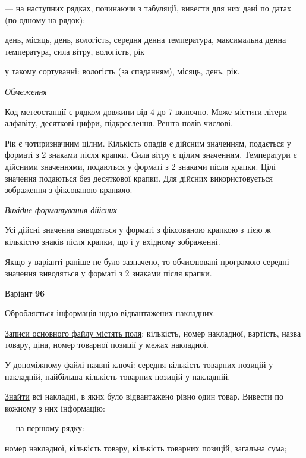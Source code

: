 \documentclass[11pt, ukrainian]{article}
\begin{document}
{\noindent}--- на наступних рядках, починаючи з табуляції, вивести для них дані по датах (по одному на рядок):\par
день, місяць, день, вологість, середня денна температура, максимальна денна температура, сила вітру, вологість, рік

{\noindent}у такому сортуванні: вологість (за спаданням), місяць, день, рік.


\bigskip\textit{Обмеження}

Код метеостанції є рядком довжини від 4 до 7 включно.
Може містити літери алфавіту, десяткові цифри, підкреслення. Решта полів числові.

Рік є чотиризначним цілим.
Кількість опадів є дійсним значенням, подається у форматі з 2 знаками після крапки.
Сила вітру є цілим значенням.
Температури є дійсними значеннями, подаються у форматі з 2 знаками після крапки.
Цілі значення подаються без десяткової крапки.
Для дійсних використовується зображення з фіксованою крапкою.

\textit{Вихідне форматування дійсних}

Усі дійсні значення виводяться у форматі з фіксованою крапкою з тією ж кількістю знаків після крапки, що і у вхідному зображенні.

Якщо у варіанті раніше не було зазначено, то \underline{обчислювані програмою} середні значення виводяться у форматі з 2 знаками після крапки.




\par
\newpage
{\center Варіант  \No \textbf { 96 }\par}
\bigskip
Обробляється інформація щодо відвантажених накладних.

\underline{Записи основного файлу містять поля}: кількість, номер накладної, вартість, назва товару, ціна, номер товарної позиції у межах накладної.

\underline{У допоміжному файлі наявні ключі}: середня кількість товарних позицій у накладній, найбільша кількість товарних позицій у накладній.

\underline{Знайти} всі накладні, в яких було відвантажено рівно один товар. Вивести по кожному з них інформацію:\par
{\noindent}--- на першому рядку:\par
номер накладної, кількість товару, кількість товарних позицій, загальна сума;
\end{document}
